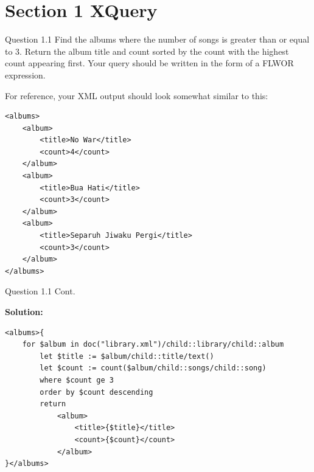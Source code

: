 \section*{Section 1 XQuery}

\begin{frame}[fragile]{Question 1.1}
Find the albums where the number of songs is greater than or equal to 3. Return the album title and count sorted by the count with the highest count appearing first. Your query should be written in the form of a FLWOR expression.\\\vspace{10pt}

For reference, your XML output should look somewhat similar to this:\\

\begin{lstlisting}[style=xml-small-nomargin]
<albums>
	<album>
		<title>No War</title>
		<count>4</count>
	</album>
	<album>
		<title>Bua Hati</title>
		<count>3</count>
	</album>
	<album>
		<title>Separuh Jiwaku Pergi</title>
		<count>3</count>
	</album>
</albums>
\end{lstlisting}
\end{frame}

\begin{frame}[fragile]{Question 1.1 Cont.}

\textbf{Solution:}
\begin{lstlisting}[style=xml-small]
<albums>{
	for $album in doc("library.xml")/child::library/child::album
		let $title := $album/child::title/text()
		let $count := count($album/child::songs/child::song)
		where $count ge 3
		order by $count descending
		return
			<album>
				<title>{$title}</title>
				<count>{$count}</count>
			</album>
}</albums>
\end{lstlisting}
\end{frame}

